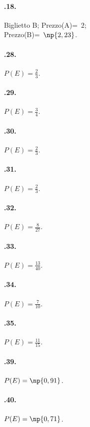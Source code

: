 \begin{multicols}{2}
\paragraph{\thechapter.18.} Biglietto B; Prezzo(A)=\officialeuro~$2$;\protect\\ Prezzo(B)=\officialeuro~$\np{2,23}$.

\paragraph{\thechapter.28.} $P(E)=\frac 2 3$.

\paragraph{\thechapter.29.} $P(E)=\frac 3 4$.

\paragraph{\thechapter.30.} $P(E)=\frac 2 3$.

\paragraph{\thechapter.31.} $P(E)=\frac 2 3$.

\paragraph{\thechapter.32.} $P(E)=\frac 8{27}$.

\paragraph{\thechapter.33.} $P(E)=\frac{13}{40}$.

\paragraph{\thechapter.34.} $P(E)=\frac 7{10}$.

\paragraph{\thechapter.35.} $P(E)=\frac{11}{15}$.

\paragraph{\thechapter.39.} $P(E)=\np{0,91}$.

\paragraph{\thechapter.40.} $P(E)=\np{0,71}$.


\end{multicols}
